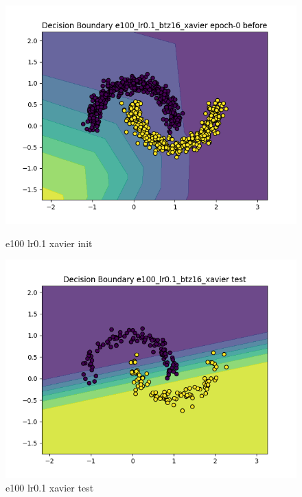 \documentclass[8pt]{article}
\begin{document}
\begin{figure}[H]
    \centering
    \begin{minipage}{0.32\textwidth}
        \centering
        \includegraphics[width=\textwidth]{../Prob4/out/1024_173617/e100_lr0.1_btz16_xavier/decision_boundary_epoch-0 before.png}
        \caption{e100 lr0.1 xavier init}
        \label{fig:e100 lr0.1 xavier init}
    \end{minipage}
    \begin{minipage}{0.32\textwidth}
        \centering
        \includegraphics[width=\textwidth]{../Prob4/out/1024_173617/e100_lr0.1_btz16_xavier/decision_boundary_test.png}
        \caption{e100 lr0.1 xavier test}
        \label{fig:e100 lr0.1 xavier test}

\end{minipage}
\end{figure}
\end{document}
